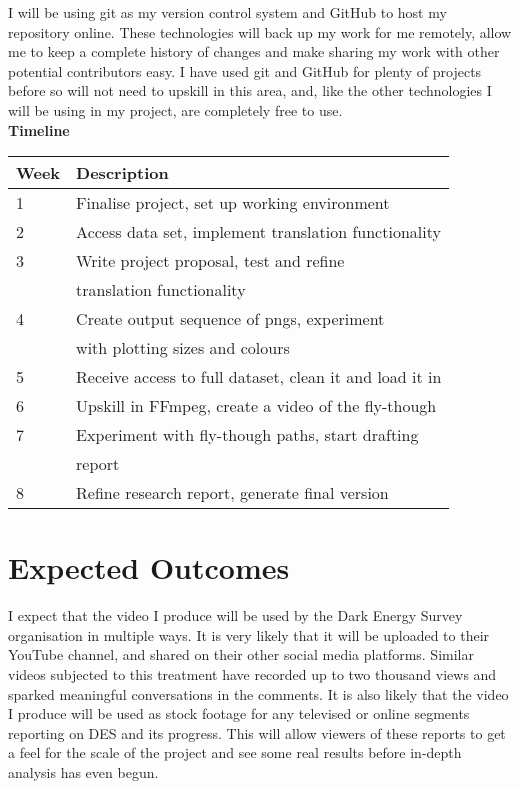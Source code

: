 \documentclass[pra, reprint, A4 paper, bibnotes]{revtex4-1}
\begin{document}
I will be using git as my version control system and GitHub to host my repository online. These technologies will back up my work for me remotely, allow me to keep a complete history of changes and make sharing my work with other potential contributors easy. I have used git and GitHub for plenty of projects before so will not need to upskill in this area, and, like the other technologies I will be using in my project, are completely free to use.\\

\textbf{Timeline}

\begin{table}[H]
\begin{tabular}{ll}
\hline
Week & Description                                                                                             \\\hline
1    & Finalise project, set up working environment\\
2    & Access data set, implement translation functionality                                      \\
3    & Write project proposal, test and refine \\&translation functionality                                  \\
4    & Create output sequence of pngs, experiment  \\&with plotting sizes and colours                              \\
5    & Receive access to full dataset, clean it and load it in                                                 \\
6    & Upskill in FFmpeg, create a video of the fly-though                                                     \\
7    & Experiment with fly-though paths, start drafting \\&report                                                 \\
8    & Refine research report, generate final version      \\\hline                                                   
\end{tabular}
\end{table}
            
\section{Expected Outcomes}
I expect that the video I produce will be used by the Dark Energy Survey organisation in multiple ways. It is very likely that it will be uploaded to their YouTube channel, and shared on their other social media platforms. Similar videos subjected to this treatment have recorded up to two thousand views and sparked meaningful conversations in the comments. It is also likely that the video I produce will be used as stock footage for any televised or online segments reporting on DES and its progress. This will allow viewers of these reports to get a feel for the scale of the project and see some real results before in-depth analysis has even begun.\\
\end{document}
